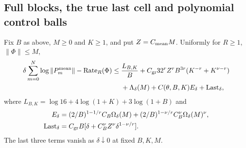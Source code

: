 \subsection{Full blocks, the true last cell and polynomial control balls}

\begin{proposition}
  \label{P:uniform-mean-product}
  Fix $B$ as above, $M \ge 0$ and $K \ge 1$, and put $Z = C_{\rm mean}M$.
  Uniformly for $R \ge 1$, $\|\Phi\| \le M$,
  \begin{align}
    \delta\sum_{m=0}^N\log\|P_m^{\rm mean}\|
    -\operatorname{Rate}_R(\Phi)
    \le{}&\frac{L_{B,K}}B+
    C_{\rm gr}32^r Z^rB^{3r}(K^{-r}+K^{\nu-r})\notag\\
    &+\Lambda_\delta(M)+C(\theta,B,K)E_\delta+
    \operatorname{Last}_\delta,\label{E:uniform-mean-product}
  \end{align}
  where $L_{B,K} = \log16+4\log(1+K)+3\log(1+B)$ and
  \begin{align*}
    E_\delta&=(2/B)^{1-1/r}C_B\Omega_\delta(M)
    +(2/B)^{1-\nu/r}C_B^\nu\Omega_\delta(M)^\nu,\\
    \operatorname{Last}_\delta&=
    C_{\rm gr}B[\delta+C_B^\nu Z^\nu\delta^{1-\nu/r}].
  \end{align*}
  The last three terms vanish as $\delta\downarrow0$ at fixed $B,K,M$.
\end{proposition}

